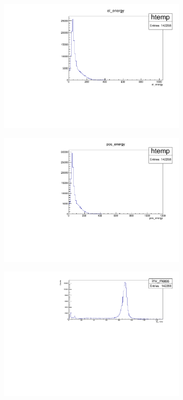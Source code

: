 \documentclass[11pt,a4paper,notitlepage]{scrartcl}
\begin{document}
\begin{figure}[htbp]
	\centering
	\begin{subfigure}{.49\linewidth}
		\includegraphics[width=\linewidth]{calibration/el_energy}
	\end{subfigure}
\begin{subfigure}{.49\linewidth}
	\includegraphics[width=\linewidth]{calibration/pos_energy}
\end{subfigure}
\begin{subfigure}{.8\linewidth}
	\includegraphics[width=\linewidth]{calibration/inv_mass}

\end{subfigure}
\end{figure}
\end{document}
